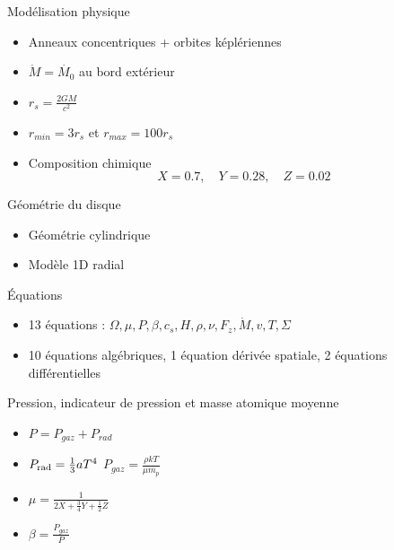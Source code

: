 \documentclass{beamer}
\begin{document}
\begin{frame}{Modélisation physique}
\begin{itemize}
  \item Anneaux concentriques + orbites képlériennes
  \item $\dot{M}=\dot{M_0}$ au bord extérieur
  \item  $r_s=\frac{2GM}{c^2}$
  \item $r_{min}=3r_s$ et $r_{max}=100r_s$
  \item Composition chimique $$X=0.7,\quad Y=0.28, \quad Z=0.02$$
\end{itemize}

\end{frame}

\begin{frame}{Géométrie du disque}
    \begin{itemize}
        \item Géométrie cylindrique
        \item Modèle 1D radial
    \end{itemize}
\end{frame}

\begin{frame}{Équations}
    \begin{itemize}
        \item 13 équations : $\Omega, \mu, P, \beta, c_s, H, \rho, \nu, F_z, \dot M, v, T, \Sigma$
        \item 10 équations algébriques, 1 équation dérivée spatiale, 2 équations différentielles
    \end{itemize}
\end{frame}

\begin{frame}{Pression, indicateur de pression et masse atomique moyenne}
    \begin{itemize}
        \item $P=P_{gaz}+P_{rad}$
        \item $P_{\rm{rad}}=\frac{1}{3}aT^4$ $P_{gaz}=\frac{\rho k T}{\mu m_p}$
        \item $\mu = \frac{1}{2X+\frac{3}{4}Y+\frac{1}{2}Z}$
        \item $\beta=\frac{P_{gaz}}{P}$
    \end{itemize}
\end{frame}
\end{document}
